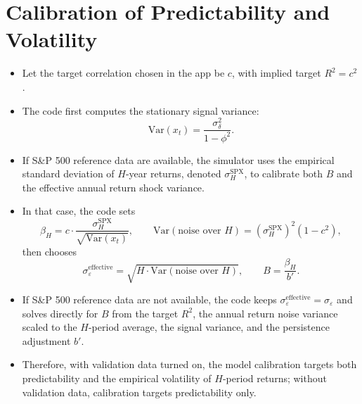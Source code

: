 \documentclass[11pt]{article}
\begin{document}
\section*{Calibration of Predictability and Volatility}
\begin{itemize}
\item Let the target correlation chosen in the app be \(c\), with implied target \(R^2 = c^2\).
\item The code first computes the stationary signal variance:
\[
\mathrm{Var}(x_t) = \frac{\sigma_{\delta}^2}{1-\phi^2}.
\]
\item If S\&P 500 reference data are available, the simulator uses the empirical standard deviation of \(H\)-year returns, denoted \(\sigma_H^{\mathrm{SPX}}\), to calibrate both \(B\) and the effective annual return shock variance.
\item In that case, the code sets
\[
\beta_H = c \cdot \frac{\sigma_H^{\mathrm{SPX}}}{\sqrt{\mathrm{Var}(x_t)}},
\qquad
\mathrm{Var}(\text{noise over }H) = (\sigma_H^{\mathrm{SPX}})^2 (1-c^2),
\]
then chooses
\[
\sigma_{\varepsilon}^{\mathrm{effective}} = \sqrt{H \cdot \mathrm{Var}(\text{noise over }H)},
\qquad
B = \frac{\beta_H}{b'}.
\]
\item If S\&P 500 reference data are not available, the code keeps \(\sigma_{\varepsilon}^{\mathrm{effective}} = \sigma_{\varepsilon}\) and solves directly for \(B\) from the target \(R^2\), the annual return noise variance scaled to the \(H\)-period average, the signal variance, and the persistence adjustment \(b'\).
\item Therefore, with validation data turned on, the model calibration targets both predictability and the empirical volatility of \(H\)-period returns; without validation data, calibration targets predictability only.
\end{itemize}
\end{document}
